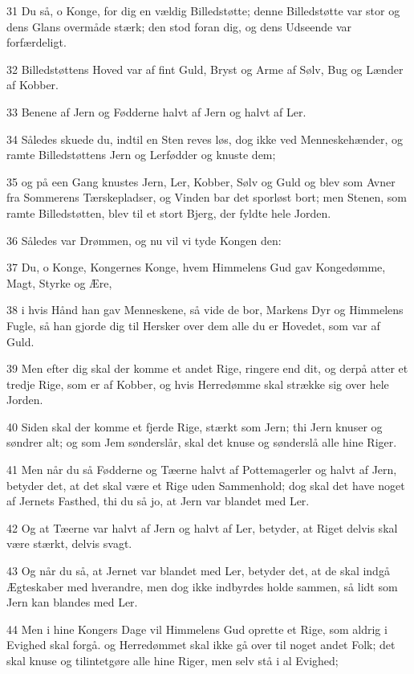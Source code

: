 \par 31 Du så, o Konge, for dig en vældig Billedstøtte; denne Billedstøtte var stor og dens Glans overmåde stærk; den stod foran dig, og dens Udseende var forfærdeligt.
\par 32 Billedstøttens Hoved var af fint Guld, Bryst og Arme af Sølv, Bug og Lænder af Kobber.
\par 33 Benene af Jern og Fødderne halvt af Jern og halvt af Ler.
\par 34 Således skuede du, indtil en Sten reves løs, dog ikke ved Menneskehænder, og ramte Billedstøttens Jern og Lerfødder og knuste dem;
\par 35 og på een Gang knustes Jern, Ler, Kobber, Sølv og Guld og blev som Avner fra Sommerens Tærskepladser, og Vinden bar det sporløst bort; men Stenen, som ramte Billedstøtten, blev til et stort Bjerg, der fyldte hele Jorden.
\par 36 Således var Drømmen, og nu vil vi tyde Kongen den:
\par 37 Du, o Konge, Kongernes Konge, hvem Himmelens Gud gav Kongedømme, Magt, Styrke og Ære,
\par 38 i hvis Hånd han gav Menneskene, så vide de bor, Markens Dyr og Himmelens Fugle, så han gjorde dig til Hersker over dem alle du er Hovedet, som var af Guld.
\par 39 Men efter dig skal der komme et andet Rige, ringere end dit, og derpå atter et tredje Rige, som er af Kobber, og hvis Herredømme skal strække sig over hele Jorden.
\par 40 Siden skal der komme et fjerde Rige, stærkt som Jern; thi Jern knuser og søndrer alt; og som Jem sønderslår, skal det knuse og sønderslå alle hine Riger.
\par 41 Men når du så Fødderne og Tæerne halvt af Pottemagerler og halvt af Jern, betyder det, at det skal være et Rige uden Sammenhold; dog skal det have noget af Jernets Fasthed, thi du så jo, at Jern var blandet med Ler.
\par 42 Og at Tæerne var halvt af Jern og halvt af Ler, betyder, at Riget delvis skal være stærkt, delvis svagt.
\par 43 Og når du så, at Jernet var blandet med Ler, betyder det, at de skal indgå Ægteskaber med hverandre, men dog ikke indbyrdes holde sammen, så lidt som Jern kan blandes med Ler.
\par 44 Men i hine Kongers Dage vil Himmelens Gud oprette et Rige, som aldrig i Evighed skal forgå. og Herredømmet skal ikke gå over til noget andet Folk; det skal knuse og tilintetgøre alle hine Riger, men selv stå i al Evighed;
